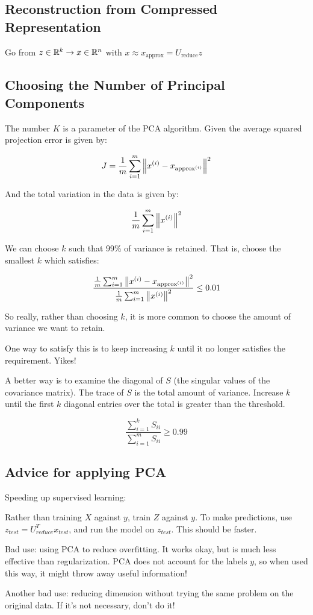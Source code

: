 \subsection{Reconstruction from Compressed Representation}

Go from $z \in \mathbb{R}^k \to x \in \mathbb{R}^n$
with $x \approx x_{\text{approx}} = U_{\text{reduce}} z$

\subsection{Choosing the Number of Principal Components}

The number $K$ is a parameter of the PCA algorithm.
Given the average squared projection error is given by:

\[ J = \frac{1}{m} \sum_{i=1}^m \left\lVert  x_{}^{(i)} - x_{\text{approx}^{(i)}} \right\rVert^2 \]

And the total variation in the data is given by:

\[ \frac{1}{m} \sum_{i=1}^m \left\lVert x_{}^{(i)} \right\rVert^2 \]

We can choose $k$ such that 99\% of variance is retained.
That is, choose the smallest $k$ which satisfies:

\[
    \frac{
        \frac{1}{m} \sum_{i=1}^m \left\lVert  x_{}^{(i)} - x_{\text{approx}^{(i)}} \right\rVert^2
    }{
        \frac{1}{m} \sum_{i=1}^m \left\lVert x_{}^{(i)} \right\rVert^2
    }
    \leq 0.01
\]

So really, rather than choosing $k$,
it is more common to choose the amount of variance we want to retain.

One way to satisfy this is to keep increasing $k$
until it no longer satisfies the requirement.
Yikes!

A better way is to examine the diagonal of $S$
(the singular values of the covariance matrix).
The trace of $S$ is the total amount of variance.
Increase $k$ until the first $k$ diagonal entries
over the total is greater than the threshold.

\[ \frac{\sum_{i=1}^k S_{ii}}{\sum_{i=1}^m S_{ii}} \geq 0.99 \]

\subsection{Advice for applying PCA}

Speeding up supervised learning:

Rather than training $X$ against $y$, train $Z$ against $y$.
To make predictions, use $z_{test} = U_{reduce}^T x_{test}$,
and run the model on $z_{test}$.
This should be faster.

Bad use: using PCA to reduce overfitting.
It works okay, but is much less effective than regularization.
PCA does not account for the labels $y$, so when used this way,
it might throw away useful information!

Another bad use: reducing dimension without trying the same problem
on the original data.  If it's not necessary, don't do it!
